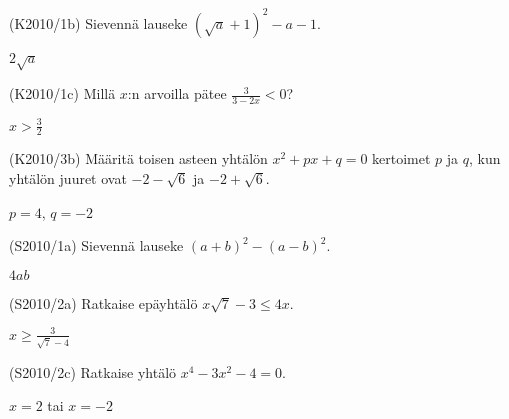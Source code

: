 \begin{tehtava}
(K2010/1b) Sievennä lauseke $(\sqrt{a}+1)^2-a-1$.
\begin{vastaus}
$2\sqrt{a}$
\end{vastaus}
\end{tehtava}

\begin{tehtava}
(K2010/1c) Millä $x$:n arvoilla pätee $\frac{3}{3-2x}<0$?
\begin{vastaus}
$x>\frac{3}{2}$
\end{vastaus}
\end{tehtava}

\begin{tehtava}
(K2010/3b) Määritä toisen asteen yhtälön $x^2+px+q=0$ kertoimet $p$ ja $q$, kun yhtälön juuret ovat $-2-\sqrt{6}$ ja $-2+\sqrt{6}$.
\begin{vastaus}
$p=4$, $q=-2$
\end{vastaus}
\end{tehtava}

\begin{tehtava}
(S2010/1a) Sievennä lauseke $(a+b)^2-(a-b)^2$.
\begin{vastaus}
$4ab$
\end{vastaus}
\end{tehtava}

\begin{tehtava}
(S2010/2a) Ratkaise epäyhtälö $x\sqrt{7}-3 \leq 4x$.
\begin{vastaus}
$x \geq \frac{3}{\sqrt{7}-4}$
\end{vastaus}
\end{tehtava}

\begin{tehtava}
(S2010/2c) Ratkaise yhtälö $x^4-3x^2-4=0$.
\begin{vastaus}
$x=2$ tai $x=-2$
\end{vastaus}
\end{tehtava}


